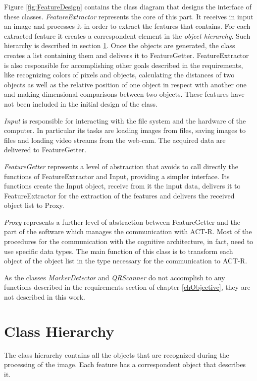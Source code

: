 		Figure \ref{fig:FeatureDesign} contains the class diagram that designs the interface of these classes.
		\emph{FeatureExtractor} represents the core of this part. It receives in input an image and processes it in order to extract the features that contains. For each extracted feature it creates a correspondent element in the \emph{object hierarchy}. Such hierarchy is described in section \ref{classHierarchy}. Once the objects are generated, the class creates a list containing them and delivers it to FeatureGetter. 
		FeatureExtractor is also responsible for accomplishing other goals described in the requirements, like recognizing colors of pixels and objects, calculating the distances of two objects as well as the relative position of one object in respect with another one and making dimensional comparisons between two objects. These features have not been included in the initial design of the class. %

		\emph{Input} is responsible for interacting with the file system and the hardware of the computer. In particular its tasks are loading images from files, saving images to files and loading video streams from the web-cam. The acquired data are delivered to FeatureGetter. 

		\emph{FeatureGetter} represents a level of abstraction that avoids to call directly the functions of FeatureExtractor and Input, providing a simpler interface. Its functions create the Input object, receive from it the input data, delivers it to FeatureExtractor for the extraction of the features and delivers the received object list to Proxy.

		\emph{Proxy} represents a further level of abstraction between FeatureGetter and the part of the software which manages the communication with ACT-R. Most of the procedures for the communication with the cognitive architecture, in fact, need to use specific data types. The main function of this class is to transform each object of the object list in the type necessary for the communication to ACT-R.

		As the classes \emph{MarkerDetector} and \emph{QRScanner} do not accomplish to any functions described in the requirements section of chapter \ref{chObjective}, they are not described in this work.

		

		\section{Class Hierarchy}\label{classHierarchy}
		The class hierarchy contains all the objects that are recognized during the processing of the image. Each feature has a correspondent object that describes it. 
	
